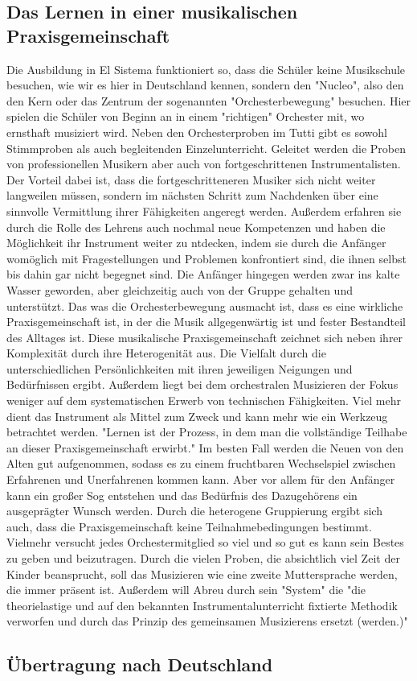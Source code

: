 \subsection{Das Lernen in einer musikalischen Praxisgemeinschaft}
Die Ausbildung in El Sistema funktioniert so, dass die Schüler keine Musikschule
besuchen, wie wir es hier in Deutschland kennen, sondern den "Nucleo", also den
den Kern oder das Zentrum der sogenannten "Orchesterbewegung" besuchen. Hier
spielen die Schüler von Beginn an in einem "richtigen" Orchester mit, wo
ernsthaft musiziert wird. Neben den Orchesterproben im Tutti gibt es sowohl
Stimmproben als auch begleitenden Einzelunterricht. Geleitet werden die Proben
von professionellen Musikern aber auch von fortgeschrittenen Instrumentalisten.
\autocite[45]{kaufmann:el_sistema} Der Vorteil dabei ist, dass die
fortgeschritteneren Musiker sich nicht weiter langweilen müssen, sondern im
nächsten Schritt zum Nachdenken über eine sinnvolle Vermittlung ihrer
Fähigkeiten angeregt werden. Außerdem erfahren sie durch die Rolle des Lehrens
auch nochmal neue Kompetenzen und haben die Möglichkeit ihr Instrument weiter zu
ntdecken, indem sie durch die Anfänger womöglich mit Fragestellungen und
Problemen konfrontiert sind, die ihnen selbst bis dahin gar nicht begegnet sind.
Die Anfänger hingegen werden zwar ins kalte Wasser
geworden, aber gleichzeitig auch von der Gruppe gehalten und unterstützt.
Das was die Orchesterbewegung ausmacht ist, dass es eine wirkliche
Praxisgemeinschaft ist, in der die Musik allgegenwärtig ist und fester
Bestandteil des Alltages ist. Diese musikalische Praxisgemeinschaft zeichnet
sich neben ihrer Komplexität durch ihre Heterogenität aus. Die Vielfalt durch
die unterschiedlichen Persönlichkeiten mit ihren jeweiligen Neigungen und
Bedürfnissen ergibt. %
Außerdem liegt bei dem orchestralen Musizieren der Fokus weniger auf dem
systematischen Erwerb von technischen Fähigkeiten. Viel mehr dient das
Instrument als Mittel zum Zweck und kann mehr wie ein Werkzeug betrachtet
werden. "Lernen ist der Prozess, in dem man die vollständige Teilhabe an dieser
Praxisgemeinschaft erwirbt." Im besten Fall werden die Neuen von den Alten gut
aufgenommen, sodass es zu einem fruchtbaren Wechselspiel zwischen Erfahrenen und
Unerfahrenen kommen kann. Aber vor allem für den Anfänger kann ein großer Sog
entstehen und das Bedürfnis des Dazugehörens ein ausgeprägter Wunsch werden.
Durch die heterogene Gruppierung ergibt sich auch, dass die Praxisgemeinschaft
keine Teilnahmebedingungen bestimmt. Vielmehr versucht jedes Orchestermitglied
so viel und so gut es kann sein Bestes zu geben und beizutragen. Durch die
vielen Proben, die absichtlich viel Zeit der Kinder beansprucht, soll das
Musizieren wie eine zweite Muttersprache werden, die immer präsent ist.%
Außerdem will Abreu durch sein "System" die "die theorielastige und auf den
bekannten Instrumentalunterricht fixtierte Methodik verworfen und durch das
Prinzip des gemeinsamen Musizierens ersetzt (werden.)" \autocite[45]{kaufmann:el_sistema}


\subsection{Übertragung nach Deutschland}

